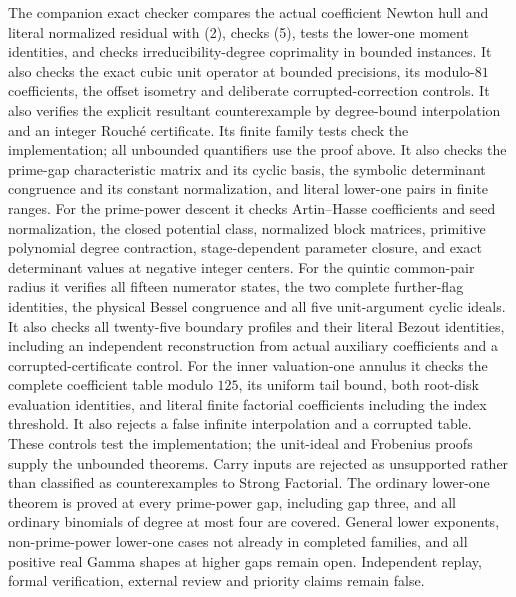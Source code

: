 \documentclass[11pt]{article}
\begin{document}
The companion exact checker compares the actual coefficient Newton
hull and literal normalized residual with (2), checks (5), tests
the lower-one moment identities, and checks irreducibility-degree
coprimality in bounded instances. It also checks the exact cubic unit
operator at bounded precisions, its modulo-$81$ coefficients, the
offset isometry and deliberate corrupted-correction controls. It also verifies the explicit
resultant counterexample by degree-bound interpolation and an integer
Rouch\'e certificate. Its finite family tests check the implementation; all unbounded quantifiers use the proof above.
It also checks the prime-gap characteristic matrix and its cyclic
basis, the symbolic determinant congruence and its constant normalization,
and literal lower-one pairs in finite ranges. For the prime-power
descent it checks Artin--Hasse coefficients and seed normalization,
the closed potential class, normalized block matrices, primitive
polynomial degree contraction, stage-dependent parameter closure,
and exact determinant values at negative integer centers. For the
quintic common-pair radius it verifies all fifteen numerator states,
the two complete further-flag identities, the physical Bessel
congruence and all five unit-argument cyclic ideals. It also checks
all twenty-five boundary profiles and their literal Bezout identities,
including an independent reconstruction from actual auxiliary
coefficients and a corrupted-certificate control. For the inner
valuation-one annulus it checks the complete coefficient table modulo
$125$, its uniform tail bound, both root-disk evaluation identities,
and literal finite factorial coefficients including the index threshold.
It also rejects a false infinite interpolation and a corrupted table.
These controls test the implementation; the unit-ideal and
Frobenius proofs supply the unbounded theorems.
Carry inputs are rejected as unsupported rather than classified as
counterexamples to Strong Factorial.
The ordinary lower-one theorem is proved at every prime-power gap,
including gap three, and all ordinary binomials of degree at most four
are covered. General lower exponents, non-prime-power lower-one cases
not already in completed families, and all positive real Gamma shapes
at higher gaps remain open.
Independent replay, formal verification, external review and
priority claims remain false.
\end{document}
